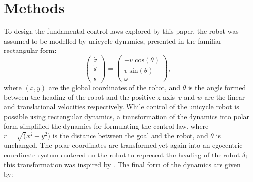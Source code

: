 \documentclass[journal]{IEEEtran}
\begin{document}
%

\section{Methods}
To design the fundamental control laws explored by this paper, the robot was assumed to be modelled by unicycle dynamics, presented in the familiar rectangular form:
$$
\left(
\begin{matrix}
\dot{x}\\
\dot{y}\\
\dot{\theta}
\end{matrix}
\right)
=
\left(
\begin{matrix}
- v \text{ cos}(\theta)\\
v \text{ sin}(\theta)\\
\omega
\end{matrix}
\right),
$$
where $(x,y)$ are the global coordinates of the robot, and $\theta$ is the angle formed between the heading of the robot and the positive x-axis--$v$ and $w$ are the linear and translational velocities respectively. While control of the unicycle robot is possible using rectangular dynamics, a transformation of the dynamics into polar form simplified the dynamics for formulating the control law, where $r=\sqrt(x^2+y^2)$ is the distance between the goal and the robot, and $\theta$ is unchanged. The polar coordinates are transformed yet again into an egocentric coordinate system centered on the robot to represent the heading of the robot $\delta$; this transformation was inspired by \cite{park2011}. The final form of the dynamics are given by:  
\end{document}
